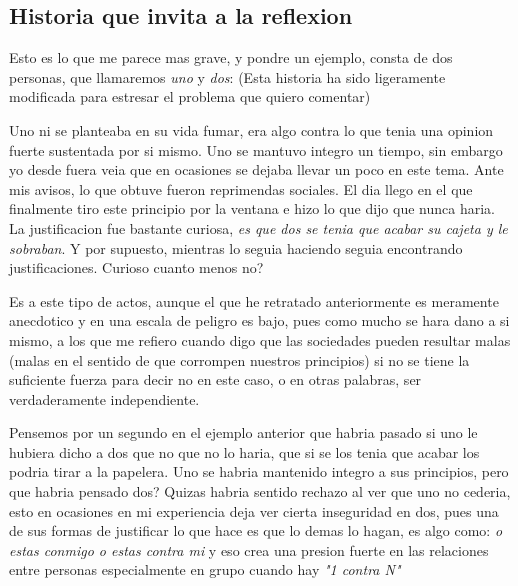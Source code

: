 \subsection{Historia que invita a la reflexion}
Esto es lo que me parece mas grave, y pondre un ejemplo, consta de dos personas, que llamaremos \textit{uno} y \textit{dos}:
(Esta historia ha sido ligeramente modificada para estresar el problema que quiero comentar)

Uno ni se planteaba en su vida fumar, era algo contra lo que tenia una opinion fuerte sustentada por si mismo. Uno se mantuvo integro un tiempo, sin embargo yo desde fuera veia que en ocasiones se dejaba llevar un poco en este tema. Ante mis avisos, lo que obtuve fueron reprimendas sociales. El dia llego en el que finalmente tiro este principio por la ventana e hizo lo que dijo que nunca haria. La justificacion fue bastante curiosa, \textit{es que dos se tenia que acabar su cajeta y le sobraban}. Y por supuesto, mientras lo seguia haciendo seguia encontrando justificaciones. Curioso cuanto menos no? 

Es a este tipo de actos, aunque el que he retratado anteriormente es meramente anecdotico y en una escala de peligro es bajo, pues como mucho se hara dano a si mismo, a los que me refiero cuando digo que las sociedades pueden resultar malas (malas en el sentido de que corrompen nuestros principios) si no se tiene la suficiente fuerza para decir no en este caso, o en otras palabras, ser verdaderamente independiente. 

Pensemos por un segundo en el ejemplo anterior que habria pasado si uno le hubiera dicho a dos que no que no lo haria, que si se los tenia que acabar los podria tirar a la papelera. Uno se habria mantenido integro a sus principios, pero que habria pensado dos? Quizas habria sentido rechazo al ver que uno no cederia, esto en ocasiones en mi experiencia deja ver cierta inseguridad en dos, pues una de sus formas de justificar lo que hace es que lo demas lo hagan, es algo como: \textit{o estas conmigo o estas contra mi} y eso crea una presion fuerte en las relaciones entre personas especialmente en grupo cuando hay \textit{"1 contra N"} 
 
